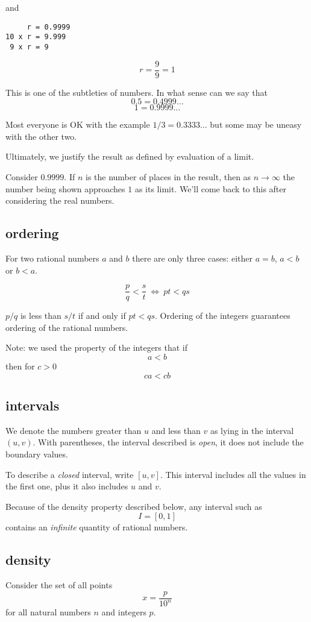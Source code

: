 \documentclass[11pt, oneside]{article}
\begin{document}
and

\begin{verbatim}
     r = 0.9999
10 x r = 9.999
 9 x r = 9
\end{verbatim}

\[ r = \frac{9}{9} = 1 \]

This is one of the subtleties of numbers.  In what sense can we say that 
\[ 0.5 = 0.4999 \dots \]
\[ 1 = 0.9999 \dots \]

Most everyone is OK with the example $1/3 = 0.3333 \dots$ but some may be uneasy with the other two.

Ultimately, we justify the result as defined by evaluation of a limit.  

Consider $0.9999$.  If $n$ is the number of places in the result, then as $n \rightarrow \infty$ the number being shown approaches $1$ as its limit.  We'll come back to this after considering the real numbers.

\subsection*{ordering}
For two rational numbers $a$ and $b$ there are only three cases:  either $a=b$, $a < b$ or $b < a$.

\[ \frac{p}{q} < \frac{s}{t} \ \iff \ pt < qs \]

$p/q$ is less than $s/t$ if and only if $pt < qs$.  Ordering of the integers guarantees ordering of the rational numbers.

Note:  we used the property of the integers that if
\[ a < b \]
then for $c > 0$
\[ ca < cb \]

\subsection*{intervals}
We denote the numbers greater than $u$ and less than $v$ as lying in the interval $(u,v)$.  With parentheses, the interval described is \emph{open}, it does not include the boundary values.

To describe a \emph{closed} interval, write $[u,v]$.  This interval includes all the values in the first one, plus it also includes $u$ and $v$.

Because of the density property described below, any interval such as
\[ I = [0,1] \]
contains an \emph{infinite} quantity of rational numbers.

\subsection*{density}
Consider the set of all points
\[ x = \frac{p}{10^n} \]
for all natural numbers $n$ and integers $p$.
\end{document}
